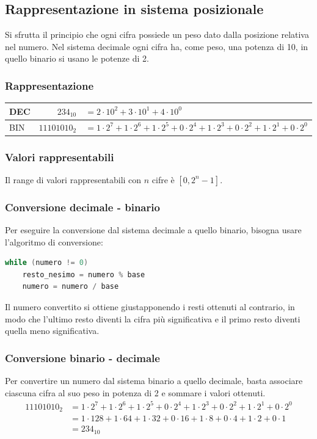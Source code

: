 \documentclass[a4paper]{article}
\begin{document}
\newpage


\subsection{Rappresentazione in sistema posizionale}
Si sfrutta il principio che ogni cifra possiede un peso dato dalla posizione relativa nel numero. Nel sistema decimale ogni
cifra ha, come peso, una potenza di 10, in quello binario si usano le potenze di 2.

\subsubsection*{Rappresentazione}
\begin{center}
	\begin{tabularx}{\textwidth}{l r X}
		DEC & \(234_{10}\) & \(= 2 \cdot 10 ^ 2 + 3 \cdot 10 ^ 1 + 4 \cdot 10 ^ 0 \) \\
		\midrule
		BIN & \(11101010_2\) & \(= 1 \cdot 2 ^ 7 + 1 \cdot 2 ^ 6 + 1 \cdot 2 ^ 5 + 0 \cdot 2 ^ 4 + 1 \cdot 2 ^ 3 + 0 \cdot 2 ^ 2 + 1 \cdot 2 ^ 1 + 0 \cdot 2 ^ 0\)
	\end{tabularx}
\end{center}

\subsubsection*{Valori rappresentabili}
Il range di valori rappresentabili con \(n\) cifre è \(\left[ 0, 2^n - 1 \right]\).

\subsubsection*{Conversione decimale - binario}
Per eseguire la conversione dal sistema decimale a quello binario, bisogna usare l'algoritmo di conversione:
\begin{lstlisting}[language=Java]
while (numero != 0)
	resto_nesimo = numero % base
	numero = numero / base
\end{lstlisting}

Il numero convertito si ottiene giustapponendo i resti ottenuti al contrario, in modo che l'ultimo resto diventi la cifra più
significativa e il primo resto diventi quella meno significativa.

\subsubsection*{Conversione binario - decimale}
Per convertire un numero dal sistema binario a quello decimale, basta associare ciascuna cifra al suo peso in potenza
di 2 e sommare i valori ottenuti.
\begin{align*}
	11101010_2 &=  1 \cdot 2 ^ 7 + 1 \cdot 2 ^ 6 + 1 \cdot 2 ^ 5 + 0 \cdot 2 ^ 4 + 1 \cdot 2 ^ 3 + 0 \cdot 2 ^ 2 + 1 \cdot 2 ^ 1 + 0 \cdot 2 ^ 0 \\
	&=  1 \cdot 128 + 1 \cdot 64 + 1 \cdot 32 + 0 \cdot 16 + 1 \cdot 8 + 0 \cdot 4 + 1 \cdot 2 + 0 \cdot 1 \\
	&= 234_{10}
\end{align*}
\end{document}
